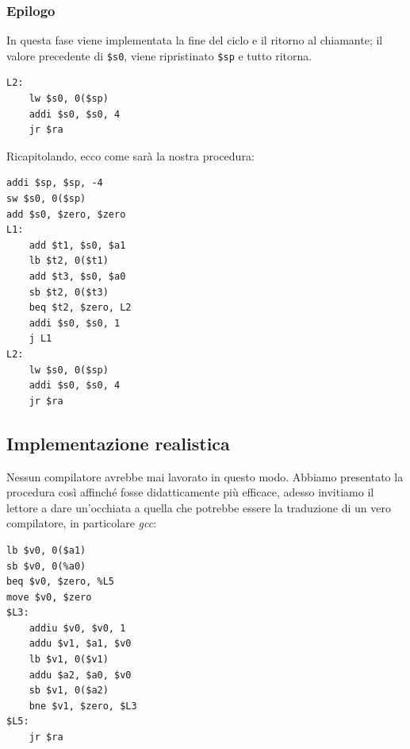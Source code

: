 \documentclass[class=book, crop=false]{standalone}
\begin{document}
\subsubsection{Epilogo}
In questa fase viene implementata la fine del ciclo e il ritorno al chiamante; il valore precedente di \texttt{\$s0}, viene ripristinato \texttt{\$sp} e tutto ritorna.
\begin{verbatim}
L2:
	lw $s0, 0($sp)
	addi $s0, $s0, 4
	jr $ra
\end{verbatim}

Ricapitolando, ecco come sarà la nostra procedura:
\begin{verbatim}
addi $sp, $sp, -4
sw $s0, 0($sp)
add $s0, $zero, $zero
L1:
	add $t1, $s0, $a1
	lb $t2, 0($t1)
	add $t3, $s0, $a0
	sb $t2, 0($t3)
	beq $t2, $zero, L2
	addi $s0, $s0, 1
	j L1
L2:
	lw $s0, 0($sp)
	addi $s0, $s0, 4
	jr $ra
\end{verbatim}

\subsection{Implementazione realistica}
Nessun compilatore avrebbe mai lavorato in questo modo. Abbiamo presentato la procedura così affinché fosse didatticamente più efficace, adesso invitiamo il lettore a dare un'occhiata a quella che potrebbe essere la traduzione di un vero compilatore, in particolare \emph{gcc}:
\begin{verbatim}
lb $v0, 0($a1)
sb $v0, 0(%a0)
beq $v0, $zero, %L5
move $v0, $zero
$L3:
	addiu $v0, $v0, 1
	addu $v1, $a1, $v0
	lb $v1, 0($v1)
	addu $a2, $a0, $v0
	sb $v1, 0($a2)
	bne $v1, $zero, $L3
$L5:
	jr $ra
\end{verbatim}
\end{document}
